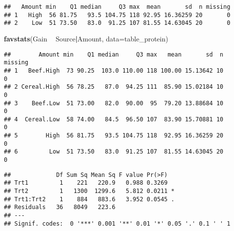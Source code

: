 \documentclass[]{article}
\newenvironment{Shaded}{\begin{snugshade}}{\end{snugshade}}
\newcommand{\CommentTok}[1]{\textcolor[rgb]{0.56,0.35,0.01}{\textit{#1}}}
\newcommand{\DataTypeTok}[1]{\textcolor[rgb]{0.13,0.29,0.53}{#1}}
\newcommand{\KeywordTok}[1]{\textcolor[rgb]{0.13,0.29,0.53}{\textbf{#1}}}
\newcommand{\NormalTok}[1]{#1}
\newcommand{\OperatorTok}[1]{\textcolor[rgb]{0.81,0.36,0.00}{\textbf{#1}}}
\newcommand{\StringTok}[1]{\textcolor[rgb]{0.31,0.60,0.02}{#1}}
\begin{document}
\begin{verbatim}
##   Amount min    Q1 median     Q3 max  mean       sd  n missing
## 1   High  56 81.75   93.5 104.75 118 92.95 16.36259 20       0
## 2    Low  51 73.50   83.0  91.25 107 81.55 14.63045 20       0
\end{verbatim}

\begin{Shaded}
\begin{Highlighting}[]
\KeywordTok{favstats}\NormalTok{(Gain }\OperatorTok{~}\StringTok{ }\NormalTok{Source}\OperatorTok{|}\NormalTok{Amount, }\DataTypeTok{data=}\NormalTok{table_protein)}
\end{Highlighting}
\end{Shaded}

\begin{verbatim}
##        Amount min    Q1 median     Q3 max   mean       sd  n missing
## 1   Beef.High  73 90.25  103.0 110.00 118 100.00 15.13642 10       0
## 2 Cereal.High  56 78.25   87.0  94.25 111  85.90 15.02184 10       0
## 3    Beef.Low  51 73.00   82.0  90.00  95  79.20 13.88684 10       0
## 4  Cereal.Low  58 74.00   84.5  96.50 107  83.90 15.70881 10       0
## 5        High  56 81.75   93.5 104.75 118  92.95 16.36259 20       0
## 6         Low  51 73.50   83.0  91.25 107  81.55 14.63045 20       0
\end{verbatim}

\begin{Shaded}
\end{Shaded}

\begin{verbatim}
##             Df Sum Sq Mean Sq F value Pr(>F)  
## Trt1         1    221   220.9   0.988 0.3269  
## Trt2         1   1300  1299.6   5.812 0.0211 *
## Trt1:Trt2    1    884   883.6   3.952 0.0545 .
## Residuals   36   8049   223.6                 
## ---
## Signif. codes:  0 '***' 0.001 '**' 0.01 '*' 0.05 '.' 0.1 ' ' 1
\end{verbatim}
\end{document}
